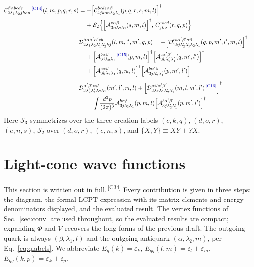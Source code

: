 \documentclass[11pt]{article}
\newcommand{\eps}{\varepsilon}
\newcommand{\dg}{\dagger}
\newcommand{\ip}[1]{\int\!\frac{d^{3}#1}{(2\pi)^{3}}}
\newcommand{\Ph}{\Phi}
\newcommand{\Vg}{\mathcal{V}}
\newcommand{\A}{\mathcal{A}}
\newcommand{\C}{\mathcal{C}}
\newcommand{\D}{\mathcal{D}}
\newcommand{\chg}[1]{{\color{blue!70!black}\textsuperscript{\,[C#1]}}}
\begin{document}
\begin{align}
\\[4pt]
\C^{\beta\alpha bcde}_{2\lambda_{1}\lambda_{2}jkon}\chg{14}(l,m,p,q,r,s)&=
-\Big[\C^{bcde\alpha\beta}_{4jkon\lambda_{2}\lambda_{1}}(p,q,r,s,m,l)\Big]^{\dg}
\nonumber\\&\hspace{0.4cm}
+\mathcal S_{2}\Big\{\Big[\A^{e\alpha\beta}_{3n\lambda_{2}\lambda_{1}}(s,m,l)\Big]^{\dg},
\,C^{\dg bcd}_{jko}(r,q,p)\Big\}
\\[4pt]
&\D^{\beta\alpha\beta'\alpha'cb}_{2\lambda_{1}\lambda_{2}\lambda_{1}'\lambda_{2}'kj}(l,m,l',m',q,p)
=-\Big[\D^{cb\alpha'\beta'\alpha\beta}_{1kj\lambda_{2}'\lambda_{1}'\lambda_{2}\lambda_{1}}
(q,p,m',l',m,l)\Big]^{\dg}
\nonumber\\
&\hspace{0.4cm}+\Big[\A^{b\alpha\beta}_{3j\lambda_{2}\lambda_{1}}\chg{15}(p,m,l)\Big]^{\dg}
\Big[\A^{c\alpha'\beta'}_{3k\lambda_{2}'\lambda_{1}'}(q,m',l')\Big]^{\dg}
\nonumber\\
&\hspace{0.4cm}+\Big[\A^{c\alpha\beta}_{3k\lambda_{2}\lambda_{1}}(q,m,l)\Big]^{\dg}
\Big[\A^{b\alpha'\beta'}_{3j\lambda_{2}'\lambda_{1}'}(p,m',l')\Big]^{\dg}
\\[4pt]
&\D^{\alpha'\beta'\alpha\beta}_{3\lambda_{2}'\lambda_{1}'\lambda_{2}\lambda_{1}}(m',l',m,l)
+\Big[\D^{\alpha\beta\alpha'\beta'}_{3\lambda_{2}\lambda_{1}\lambda_{2}'\lambda_{1}'}
(m,l,m',l')\chg{16}\Big]^{\dg}
\nonumber\\
&\hspace{0.4cm}=\ip{p}\A^{b\alpha\beta}_{3j\lambda_{2}\lambda_{1}}(p,m,l)
\Big[\A^{b\alpha'\beta'}_{3j\lambda_{2}'\lambda_{1}'}(p,m',l')\Big]^{\dg}
\label{eq:U18}
\end{align}
Here $\mathcal S_{3}$ symmetrizes over the three creation labels $(c,k,q)$, $(d,o,r)$, $(e,n,s)$,
$\mathcal S_{2}$ over $(d,o,r)$, $(e,n,s)$, and
$\{X,Y\}\equiv XY+YX$.

\section{Light-cone wave functions}
\label{sec:wf}

\begin{addbox}
This section is written out in full.\chg{34} Every contribution is given in three steps: the
diagram, the formal LCPT expression with its matrix elements and energy denominators displayed,
and the evaluated result. The vertex functions of Sec.~\ref{sec:conv} are used throughout, so the
evaluated results are compact; expanding $\Ph$ and $\Vg$ recovers the long forms of the previous
draft. The outgoing quark is always $(\beta,\lambda_{1},l)$ and the outgoing antiquark
$(\alpha,\lambda_{2},m)$, per Eq.~\eqref{eq:qlabels}. We abbreviate
$E_{g}(k)=\eps_{k}$, $E_{q\bar q}(l,m)=\eps_{l}+\eps_{m}$, $E_{gg}(k,p)=\eps_{k}+\eps_{p}$.
\end{addbox}
\end{document}
